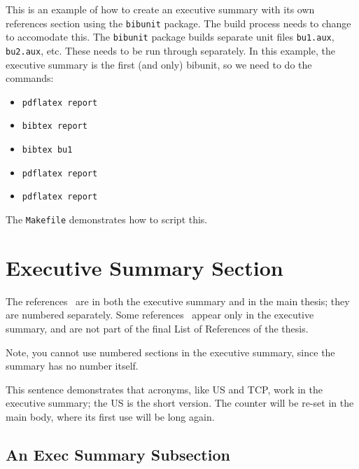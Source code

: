 \begin{bibunit}[\NPSbibStyle]
%
\ifinforms
\else
\let\citep\cite
\let\citet\cite
\fi
%

This is an example of how to create an executive summary with its own references 
section using the \texttt{bibunit} package.
The build process needs to change to accomodate this. 
The \texttt{bibunit} package builds separate unit files
\texttt{bu1.aux}, \texttt{bu2.aux}, etc. 
These needs to be run through \BibTeX{} separately.
In this example, the executive summary is the first (and only) bibunit, 
so we need to do the commands:
\begin{itemize}
	\item[] \texttt{pdflatex report}
	\item[] \texttt{bibtex report}
	\item[] \texttt{bibtex bu1}
	\item[] \texttt{pdflatex report}
	\item[] \texttt{pdflatex report}
\end{itemize}
The \texttt{Makefile} demonstrates how to script this.

\section*{Executive Summary Section} %
The references~\citet{americans_1991,haynes_2009}
are in both the executive summary
and in the main thesis; they are numbered separately.
Some references~\citep{Unicorn:1995} appear only in the executive summary,
and are not part of the final List of References of the thesis.

Note, you cannot use numbered sections in the executive summary,
since the summary has no number itself.

This sentence demonstrates that acronyms, like \ac{US} and \ac{TCP}, work in the
executive summary; the \ac{US} is the short version. The counter will be re-set
in the main body, where its first use will be long again.

\subsection*{An Exec Summary Subsection}
\lipsum[2-3] %


\end{bibunit}

